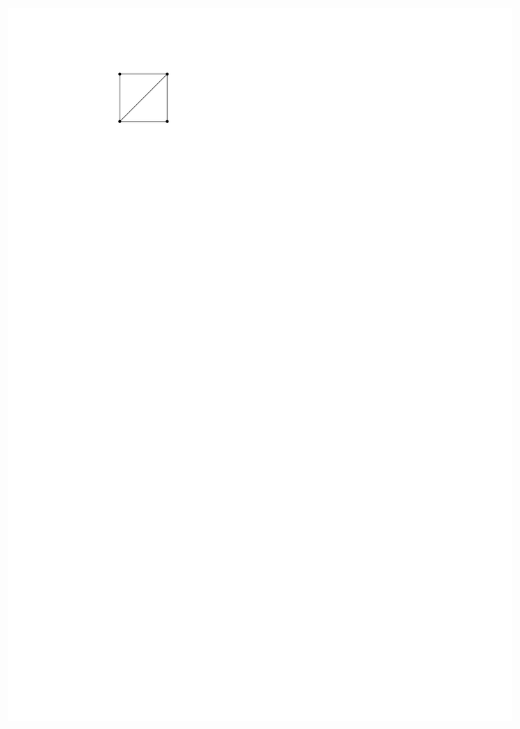 \documentclass[a4paper]{article}
\begin{document}
\includegraphics[scale=.3]{./introduction/img/caGraph.pdf}
\clearpage%
\end{document}
